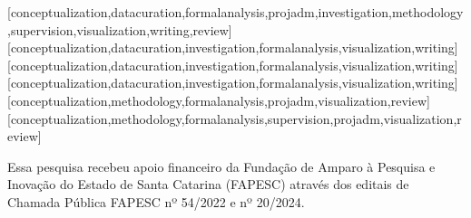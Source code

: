 \documentclass[portuguese]{textolivre}
\begin{document}
\begin{contributors}
[conceptualization,datacuration,formalanalysis,projadm,investigation,methodology,supervision,visualization,writing,review]
[conceptualization,datacuration,investigation,formalanalysis,visualization,writing]
[conceptualization,datacuration,investigation,formalanalysis,visualization,writing]
[conceptualization,datacuration,investigation,formalanalysis,visualization,writing]
[conceptualization,methodology,formalanalysis,projadm,visualization,review]
[conceptualization,methodology,formalanalysis,supervision,projadm,visualization,review]
\end{contributors}
 

\begin{dataavailability}
\end{dataavailability}

\begin{funding}
Essa pesquisa recebeu apoio financeiro da Fundação de Amparo à Pesquisa e Inovação do Estado de Santa Catarina (FAPESC) através dos editais de Chamada Pública FAPESC nº 54/2022 e nº 20/2024.
\end{funding}
\end{document}
